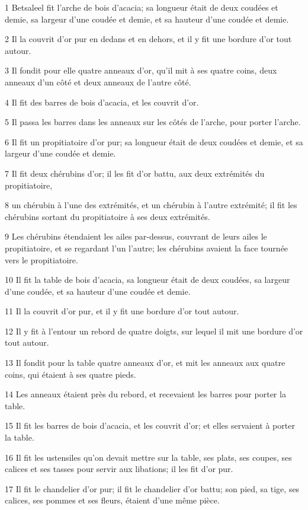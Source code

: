 \par 1 Betsaleel fit l'arche de bois d'acacia; sa longueur était de deux coudées et demie, sa largeur d'une coudée et demie, et sa hauteur d'une coudée et demie.
\par 2 Il la couvrit d'or pur en dedans et en dehors, et il y fit une bordure d'or tout autour.
\par 3 Il fondit pour elle quatre anneaux d'or, qu'il mit à ses quatre coins, deux anneaux d'un côté et deux anneaux de l'autre côté.
\par 4 Il fit des barres de bois d'acacia, et les couvrit d'or.
\par 5 Il passa les barres dans les anneaux sur les côtés de l'arche, pour porter l'arche.
\par 6 Il fit un propitiatoire d'or pur; sa longueur était de deux coudées et demie, et sa largeur d'une coudée et demie.
\par 7 Il fit deux chérubins d'or; il les fit d'or battu, aux deux extrémités du propitiatoire,
\par 8 un chérubin à l'une des extrémités, et un chérubin à l'autre extrémité; il fit les chérubins sortant du propitiatoire à ses deux extrémités.
\par 9 Les chérubins étendaient les ailes par-dessus, couvrant de leurs ailes le propitiatoire, et se regardant l'un l'autre; les chérubins avaient la face tournée vers le propitiatoire.
\par 10 Il fit la table de bois d'acacia, sa longueur était de deux coudées, sa largeur d'une coudée, et sa hauteur d'une coudée et demie.
\par 11 Il la couvrit d'or pur, et il y fit une bordure d'or tout autour.
\par 12 Il y fit à l'entour un rebord de quatre doigts, sur lequel il mit une bordure d'or tout autour.
\par 13 Il fondit pour la table quatre anneaux d'or, et mit les anneaux aux quatre coins, qui étaient à ses quatre pieds.
\par 14 Les anneaux étaient près du rebord, et recevaient les barres pour porter la table.
\par 15 Il fit les barres de bois d'acacia, et les couvrit d'or; et elles servaient à porter la table.
\par 16 Il fit les ustensiles qu'on devait mettre sur la table, ses plats, ses coupes, ses calices et ses tasses pour servir aux libations; il les fit d'or pur.
\par 17 Il fit le chandelier d'or pur; il fit le chandelier d'or battu; son pied, sa tige, ses calices, ses pommes et ses fleurs, étaient d'une même pièce.
